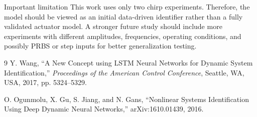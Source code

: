 \documentclass[11pt]{article}
\begin{document}
\begin{cautionbox}{Important limitation}
This work uses only two chirp experiments. Therefore, the model should be viewed as an initial data-driven identifier rather than a fully validated actuator model. A stronger future study should include more experiments with different amplitudes, frequencies, operating conditions, and possibly PRBS or step inputs for better generalization testing.
\end{cautionbox}

\begin{thebibliography}{9}
Y. Wang, ``A New Concept using LSTM Neural Networks for Dynamic System Identification,'' \textit{Proceedings of the American Control Conference}, Seattle, WA, USA, 2017, pp. 5324--5329.

O. Ogunmolu, X. Gu, S. Jiang, and N. Gans, ``Nonlinear Systems Identification Using Deep Dynamic Neural Networks,'' arXiv:1610.01439, 2016.
\end{thebibliography}
\end{document}
